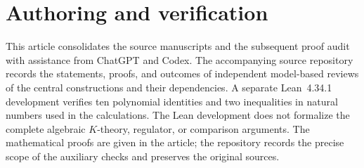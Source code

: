 \documentclass[11pt,a4paper]{amsart}
\numberwithin{equation}{section}
\theoremstyle{definition}
\theoremstyle{remark}
\begin{document}


\section*{Authoring and verification}
This article consolidates the source manuscripts and the subsequent proof
audit with assistance from ChatGPT and Codex. The accompanying source
repository records the statements, proofs, and outcomes of independent
model-based reviews of the central constructions and their dependencies.
A separate Lean~4.34.1 development verifies ten polynomial identities
and two inequalities in natural numbers used in the calculations.
The Lean development does not formalize the complete algebraic
$K$-theory, regulator, or comparison arguments. The mathematical proofs
are given in the article; the repository records the precise scope of
the auxiliary checks and preserves the original sources.

\end{document}
